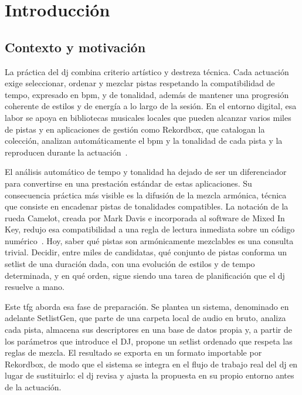 
\chapter{Introducción}
\label{cha:introduccion}

\section{Contexto y motivación}
\label{sec:intro-contexto}

La práctica del \acf{dj} combina criterio artístico y destreza técnica. Cada actuación exige seleccionar, ordenar y mezclar pistas respetando la compatibilidad de tempo, expresado en \acf{bpm}, y de tonalidad, además de mantener una progresión coherente de estilos y de energía a lo largo de la sesión. En el entorno digital, esa labor se apoya en bibliotecas musicales locales que pueden alcanzar varios miles de pistas y en aplicaciones de gestión como Rekordbox, que catalogan la colección, analizan automáticamente el \acs{bpm} y la tonalidad de cada pista y la reproducen durante la actuación~\cite{rekordbox_features}.

El análisis automático de tempo y tonalidad ha dejado de ser un diferenciador para convertirse en una prestación estándar de estas aplicaciones. Su consecuencia práctica más visible es la difusión de la mezcla armónica, técnica que consiste en encadenar pistas de tonalidades compatibles. La notación de la rueda Camelot, creada por Mark Davis e incorporada al software de Mixed In Key, redujo esa compatibilidad a una regla de lectura inmediata sobre un código numérico~\cite{mixedinkey_camelot}. Hoy, saber qué pistas son armónicamente mezclables es una consulta trivial. Decidir, entre miles de candidatas, qué conjunto de pistas conforma un setlist de una duración dada, con una evolución de estilos y de tempo determinada, y en qué orden, sigue siendo una tarea de planificación que el \acs{dj} resuelve a mano.

Este \acf{tfg} aborda esa fase de preparación. Se plantea un sistema, denominado en adelante SetlistGen, que parte de una carpeta local de audio en bruto, analiza cada pista, almacena sus descriptores en una base de datos propia y, a partir de los parámetros que introduce el DJ, propone un setlist ordenado que respeta las reglas de mezcla. El resultado se exporta en un formato importable por Rekordbox, de modo que el sistema se integra en el flujo de trabajo real del \acs{dj} en lugar de sustituirlo: el \acs{dj} revisa y ajusta la propuesta en su propio entorno antes de la actuación.

